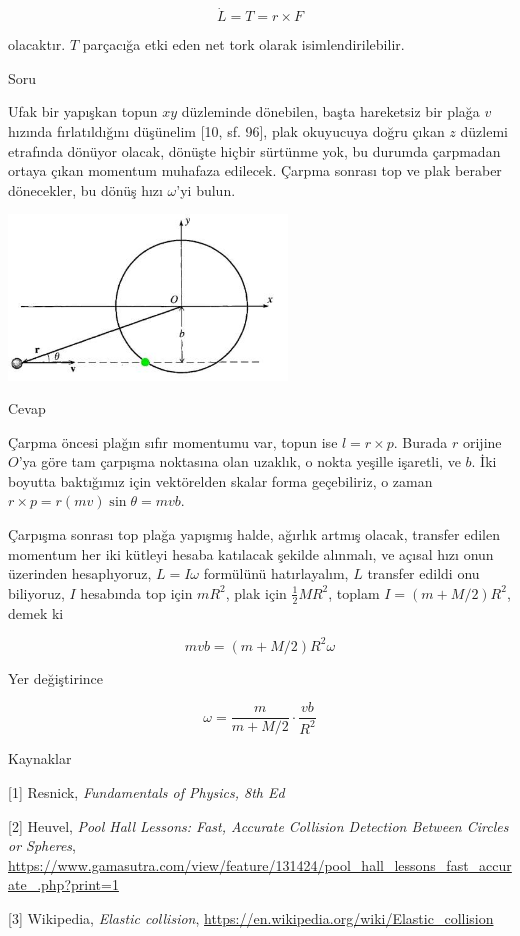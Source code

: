 \documentclass[12pt,fleqn]{article}\usepackage{../../common}
\begin{document}
$$
\dot{L} = T = r \times F
$$

olacaktır. $T$ parçacığa etki eden net tork olarak isimlendirilebilir.

Soru

Ufak bir yapışkan topun $xy$ düzleminde dönebilen, başta hareketsiz bir plağa
$v$ hızında fırlatıldığını düşünelim [10, sf. 96], plak okuyucuya doğru çıkan
$z$ düzlemi etrafında dönüyor olacak, dönüşte hiçbir sürtünme yok, bu durumda
çarpmadan ortaya çıkan momentum muhafaza edilecek. Çarpma sonrası top ve plak
beraber dönecekler, bu dönüş hızı $\omega$'yi bulun.

\includegraphics[width=20em]{phy_005_basics_02_17.jpg}

Cevap

Çarpma öncesi plağın sıfır momentumu var, topun ise $l = r \times p$. Burada $r$
orijine $O$'ya göre tam çarpışma noktasına olan uzaklık, o nokta yeşille
işaretli, ve $b$. İki boyutta baktığımız için vektörelden skalar forma
geçebiliriz, o zaman $r \times p = r (mv) \sin \theta = m v b$.

Çarpışma sonrası top plağa yapışmış halde, ağırlık artmış olacak, transfer
edilen momentum her iki kütleyi hesaba katılacak şekilde alınmalı, ve açısal
hızı onun üzerinden hesaplıyoruz, $L = I \omega$ formülünü hatırlayalım, $L$
transfer edildi onu biliyoruz, $I$ hesabında top için $mR^2$, plak için
$\frac{1}{2} M R^2$, toplam $I = (m+M/2) R^2$, demek ki

$$
m v b = (m + M/2) R^2 \omega
$$

Yer değiştirince

$$
\omega = \frac{m}{m + M/2} \cdot \frac{vb}{R^2}
$$

Kaynaklar

[1] Resnick, {\em Fundamentals of Physics, 8th Ed}

[2] Heuvel, {\em Pool Hall Lessons: Fast, Accurate Collision Detection Between Circles or Spheres},
    \url{https://www.gamasutra.com/view/feature/131424/pool_hall_lessons_fast_accurate_.php?print=1}

[3] Wikipedia, {\em Elastic collision}, \url{https://en.wikipedia.org/wiki/Elastic_collision}
\end{document}
